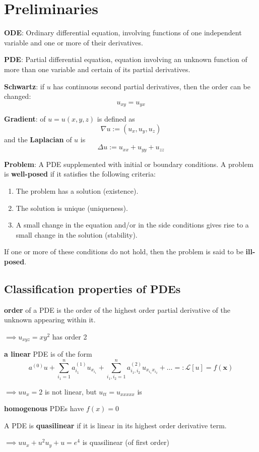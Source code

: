 \section{Preliminaries}
\textbf{ODE}: Ordinary differential equation, involving functions of one independent variable and one or more of their derivatives.

\textbf{PDE}: Partial differential equation, equation involving an unknown function of more than one variable and certain of its partial derivatives.

\textbf{Schwartz}: if $u$ has continuous second partial derivatives, then the order can be changed:
$$u_{xy} = u_{yx}$$

\textbf{Gradient}: of $u = u(x, y, z)$ is defined as
$$\nabla u := (u_x, u_y, u_z)$$
and the \textbf{Laplacian} of $u$ is
$$\Delta u := u_{xx} + u_{yy} + u_{zz}$$

\textbf{Problem}: A PDE supplemented with initial or boundary conditions. A problem is \textbf{well-posed} if it satisfies the following criteria:
\begin{enumerate}
  \item The problem has a solution (existence).
  \item The solution is unique (uniqueness).
  \item A small change in the equation and/or in the side conditions gives rise to a small change in the solution (stability).
\end{enumerate}
If one or more of these conditions do not hold, then the problem is said to be \textbf{ill-posed}.

\subsection{Classification properties of PDEs}
\textbf{order} of a PDE is the order of the highest order partial derivative of the unknown appearing within it.

$\implies u_{xyz} = xy^2$ has order 2 

\textbf{a linear} PDE is of the form
$$
a^{(0)}u + \sum_{i_1=1}^n a^{(1)}_{i_1} u_{x_{i_1}}
+ \sum_{i_1,i_2=1}^n a^{(2)}_{i_1,i_2} u_{x_{i_1}x_{i_2}} + \dots
=:\mathcal{L}[u] = f(\mathbf{x})
$$

$\implies uu_x=2$ is not linear, but $u_{tt} = u_{xxxxx}$ is

\textbf{homogenous} PDEs have $f(x)=0$

A PDE is \textbf{quasilinear} if it is linear in its highest order derivative term.

$\implies uu_x + u^2u_y + u = e^4$ is quasilinear (of first order)
